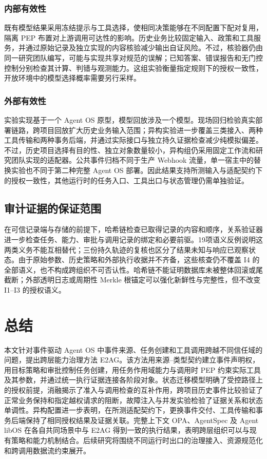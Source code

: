 \subsubsection{内部有效性}

既有模型结果采用冻结提示与工具选择，使相同决策能够在不同配置下配对复用，隔离 PEP 布置对上游调用可达性的影响。历史业务比较固定输入、政策和工具服务，并通过原始记录及独立实现的内容核验减少输出自证风险。不过，核验器仍由同一研究团队编写，可能与实现共享对规范的误解；已知答案、错误报告和无门控控制分别检查其计算、判错与观测能力。这组实验衡量指定规则下的授权一致性，开放环境中的模型选择概率需要另行采样。

\subsubsection{外部有效性}

实验实现基于一个 Agent OS 原型，模型回放涉及一个模型。现场回归检验真实部署链路，跨项目回放扩大历史业务输入范围；异构实验进一步覆盖三类接入、两种工具传输和两种事务后端，并通过实际接口与独立持久证据检查减少纯模拟偏差。不过，历史项目选择有目的性、独立对象数量较小，异构组仍采用固定工作流和研究团队实现的适配器。公共事件归档不同于生产 Webhook 流量，单一宿主中的替换实验也不同于第二种完整 Agent OS 部署。因此结果支持所测输入与适配契约下的授权一致性，其他运行时的任务入口、工具出口与状态管理仍需单独验证。

\subsection{审计证据的保证范围}

在可信记录端与存储的前提下，哈希链检查已取得记录的内容和顺序，关系验证器进一步检查任务、能力、审批与调用记录的绑定和必要前驱。19项语义反例说明这两类义务不能互相替代；三份持久轨迹的复核也区分了结果未知与响应已观察状态。由于原始参数、历史策略和外部执行收据并不齐备，这些核查仍不覆盖 I4 的全部语义，也不构成跨组织不可否认性。哈希链不能证明数据库未被整体回滚或尾截断；外部透明日志或周期性 Merkle 根锚定可以强化新鲜性与完整性，但不改变 I1--I3 的授权语义。

\section{总结}\label{sec:conclusion-v11}

本文针对事件驱动 Agent OS 中事件来源、任务创建和工具调用跨越不同信任域的问题，提出跨层能力治理方法 E2AG。该方法用来源--类型契约建立事件声明权，用目标策略和审批控制任务创建，用任务作用域能力与调用时 PEP 约束实际工具及其参数，并通过统一执行证据连接各阶段对象。状态迁移模型明确了受控路径上的授权前提，消融揭示了准入与调用检查的互补作用，跨项目历史事件比较验证了正常业务保持和指定越权请求的阻断，故障注入与并发实验检验了证据关系和状态单调性。异构配置进一步表明，在所测适配契约下，更换事件交付、工具传输和事务后端保持了相同授权结果及证据关联。完整上下文 OPA、AgentSpec 及 Agent libOS 在各自共同场景中与 E2AG 得到一致的执行结果，表明跨层组织可以与现有策略和能力机制结合。后续研究将围绕不同运行时出口的治理接入、资源规范化和跨调用数据流约束展开。

